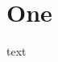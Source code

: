 \documentclass[11pt]{article}
\author{root}
\date{\today}
\title{}
\begin{document}
\section{One}
\label{sec:org88e54a7}
text
\end{document}
